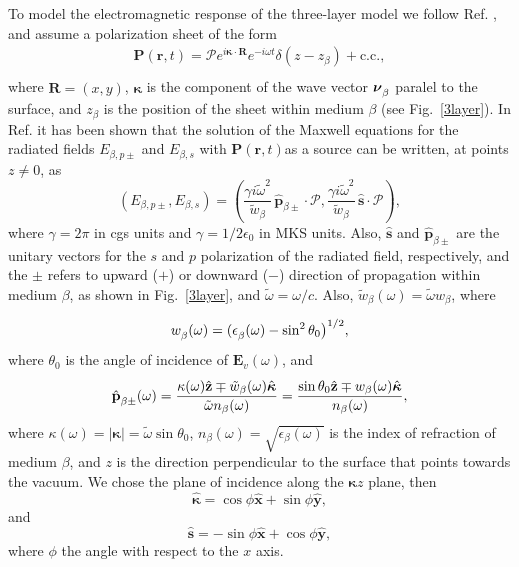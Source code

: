 \documentclass[10pt]{book}
\begin{document}
To model the electromagnetic response of the three-layer model 
we follow Ref. \cite{mizrahiJOSA88},
and assume a polarization sheet of the form
\begin{align}\label{m31}
\mathbf{P}(\mathbf{r},t)=\boldsymbol{\mathcal{P}}
e^{i\boldsymbol{\kappa}\cdot\mathbf{R}}e^{-i\omega t}\delta(z-z_\beta)+\mathrm{c.c.}
,
\end{align}
where $\mathbf{R}=(x,y)$, $\boldsymbol{\kappa}$ 
is the component of the wave
vector $\boldsymbol{\nu}^{\strut}_\beta$ paralel to the surface, and
$z_\beta$ is the position of the sheet within
medium $\beta$ (see Fig.~\ref{3layer}).
In Ref. \cite{sipeJOSAB87} it has been shown 
that the solution of the Maxwell equations for the radiated fields 
$E_{\beta,p\pm}$ and $E_{\beta,s}$
with $\mathbf{P}(\mathbf{r},t)$as a source can be written, at points
$z\neq 0$, as 
\begin{equation}\label{r2}
(E_{\beta,p\pm},E_{\beta,s}) = 
(\frac{\gamma i\tilde\omega^2}{\tilde w_\beta}
\,\hat{\mathbf{p}}_{\beta\pm}\cdot\boldsymbol{\mathcal{P}},
\frac{\gamma i\tilde\omega^2}{\tilde w_\beta}
\,\hat{\mathbf{s}}\cdot\boldsymbol{\mathcal{P}}),
\end{equation} 
where $\gamma=2\pi$ in cgs units and $\gamma=1/2\epsilon_{0}$ in MKS units.
Also,
$\hat{\mathbf{s}}$ and $\hat{\mathbf{p}}_{\beta\pm}$ are the unitary vectors for
the $s$ and $p$ polarization of the radiated field, 
respectively, and the $\pm$ refers to upward ($+$) or
downward ($-$) direction of propagation within medium $\beta$, as shown in
Fig.~\ref{3layer}, and $\tilde\omega=\omega/c$.
Also, $\tilde w_\beta(\omega)=\tilde\omega w_\beta$, where
\begin{equation}\label{r3}
w^{\strut}_\beta(\omega)=(\epsilon^{\strut}_\beta(\omega) - \sin^2\theta_0\big)^{1/2},
\end{equation}
where $\theta_0$ is the angle of incidence of $\mathbf{E}_v(\omega)$, 
and
\begin{equation}\label{r4}
\hat{\mathbf{p}}^{\strut}_{\beta\pm}(\omega) =
\frac{\kappa(\omega)\hat{\mathbf{z}}\mp \tilde 
  w_\beta(\omega)\hat{\boldsymbol{\kappa}}} 
{\tilde\omega n_\beta(\omega)}
=
\frac{\sin\theta_0\hat{\mathbf{z}}\mp 
  w_\beta(\omega)\hat{\boldsymbol{\kappa}}} 
{n_\beta(\omega)}
,
\end{equation}
where $\kappa(\omega)=|\boldsymbol{\kappa}|=\tilde\omega\sin\theta_0$,
$n_\beta(\omega)=\sqrt{\epsilon_\beta(\omega)}$ is
the index of refraction of medium $\beta$, and
$z$ is the direction perpendicular to the surface that 
points towards the vacuum.
We chose the plane of incidence along the  
$\boldsymbol{\kappa}z$ plane, then 
\begin{equation}\label{mc1}
\hat{\boldsymbol{\kappa}}
= \cos\phi\hat{\mathbf{x}} + \sin\phi\hat{\mathbf{y}},
\end{equation}
and
\begin{equation}\label{mmc2}
\hat{\mathbf{s}} = -\sin\phi\hat{\mathbf{x}} + \cos\phi\hat{\mathbf{y}},
\end{equation}
where
$\phi$ the angle with respect to the $x$ axis.
\end{document}
